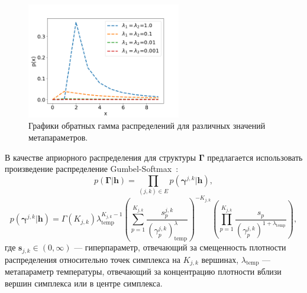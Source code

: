 \begin{figure}
\centering
\includegraphics[width=0.6\textwidth]{plots/notebooks/invgamma.png}
\caption{Графики обратных гамма распределений для различных значений метапараметров.}
\label{fig:inv-gamma}
\end{figure}

В качестве априорного распределения для структуры $\boldsymbol{\Gamma}$ предлагается использовать произведение распределение Gumbel-Softmax~\cite{gs}:
\[
    p(\boldsymbol{\Gamma}|\mathbf{h}) = \prod_{(j,k) \in E} p(\boldsymbol{\gamma}^{j,k}|\mathbf{h}),
\]
\[
    p(\boldsymbol{\gamma}^{j,k}|\mathbf{h}) = \Gamma(K_{j,k})\lambda_{\text{temp}}^{K_{j,k}-1}\left(\sum_{p=1}^{K_{j,k}} \frac{s^{j,k}_p}{(\gamma_p^{j,k})^\lambda_{\text{temp}}}\right)^{-K_{j,k}}\left(\prod_{p=1}^{K_{j,k}} \frac{s_p}{(\gamma_p^{j,k})^{1+\lambda_{\text{temp}}}}\right),
\]
где $\mathbf{s}_{j,k} \in (0,\infty)$ --- гиперпараметр, отвечающий за смещенность плотности распределения относительно точек симплекса на $K_{j,k}$ вершинах, $\lambda_{\text{temp}}$ --- метапараметр температуры, отвечающий за концентрацию плотности вблизи вершин симплекса или в центре симплекса.

